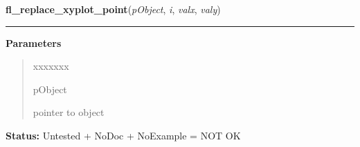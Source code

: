     \label{xformslib:library:fl_replace_xyplot_point}

    \vspace{0.5ex}

\hspace{.8\funcindent}\begin{boxedminipage}{\funcwidth}

    \raggedright \textbf{fl\_replace\_xyplot\_point}(\textit{pObject}, \textit{i}, \textit{valx}, \textit{valy})

    \vspace{-1.5ex}

    \rule{\textwidth}{0.5\fboxrule}
\setlength{\parskip}{2ex}
\setlength{\parskip}{1ex}
      \textbf{Parameters}
      \vspace{-1ex}

      \begin{quote}
        \begin{Ventry}{xxxxxxx}

          \item[pObject]

          pointer to object

        \end{Ventry}

      \end{quote}

\textbf{Status:} Untested + NoDoc + NoExample = NOT OK



    \end{boxedminipage}

    \label{xformslib:library:fl_replace_xyplot_point_in_overlay}

    \vspace{0.5ex}

